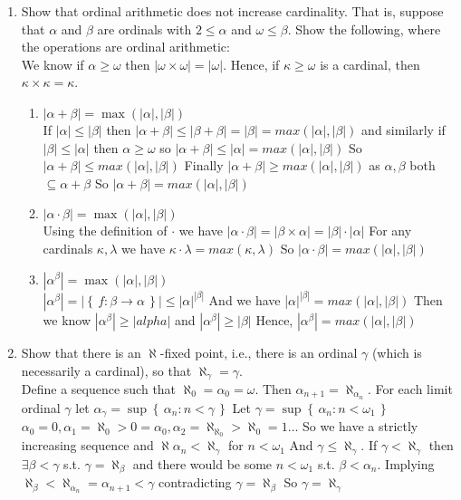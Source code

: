 \documentclass[11pt]{amsart}
\newcommand{\set}[1]{\left\{\,#1\,\right\}}
\begin{document}
\begin{enumerate}
\item Show that ordinal arithmetic does not increase cardinality. That is, suppose that $\alpha$ and $\beta$ are ordinals with $2 \leq \alpha$ and $\omega \leq \beta$. Show the following, where the operations are ordinal arithmetic:
\\
We know if $\alpha \geq \omega$ then $|\omega \times \omega| = |\omega|$.
Hence, if $\kappa \geq \omega$ is a cardinal, then $\kappa \times \kappa = \kappa$.
\ 
\begin{enumerate}
\item $|\alpha + \beta| = \max(|\alpha|, |\beta|)$
\\ If $|\alpha| \leq |\beta|$ then $|\alpha + \beta| \leq |\beta + \beta| = |\beta| = max(|\alpha|,|\beta|)$
and similarly if $|\beta| \leq |\alpha|$ then $\alpha \geq \omega$ so $|\alpha + \beta| \leq |\alpha| = max(|\alpha|,|\beta|)$
So $|\alpha + \beta| \leq max(|\alpha|,|\beta|)$
Finally $|\alpha + \beta| \geq max(|\alpha|,|\beta|)$ as $\alpha, \beta$ both $\subseteq \alpha + \beta$
So $|\alpha + \beta| = max(|\alpha|,|\beta|)$
\vfill
\item $|\alpha \cdot \beta| = \max(|\alpha|, |\beta|)$
\\ Using the definition of $\cdot$ we have $|\alpha \cdot \beta| = |\beta \times \alpha| = |\beta| \cdot |\alpha|$
For any cardinals $\kappa, \lambda$ we have $\kappa \cdot \lambda = max(\kappa,\lambda)$
So $|\alpha \cdot \beta| = max(|\alpha|,|\beta|)$
\vfill
\item $|\alpha^\beta| = \max(|\alpha|, |\beta|)$
\\ $|\alpha^\beta| = |\set{f : \beta \rightarrow \alpha}| \leq |\alpha|^{|\beta|}$
And we have |$\alpha|^{|\beta|} = max(|\alpha|,|\beta|)$
Then we know $|\alpha^\beta| \geq |alpha|$ and $|\alpha^\beta| \geq |\beta|$
Hence, $|\alpha^\beta| = max(|\alpha|,|\beta|)$
\vfill
\end{enumerate}

\newpage

\item Show that there is an $\aleph$-fixed point, i.e., there is an ordinal $\gamma$ (which is necessarily a cardinal), so that $\aleph_{\gamma} = \gamma$.
\\ Define a sequence such that $\aleph_0 = \alpha_0 = \omega$.
Then $\alpha_{n+1} = \aleph_{\alpha_n}$.
For each limit ordinal $\gamma$ let $\alpha_\gamma = \sup \set{\alpha_n : n < \gamma}$
Let $\gamma = \sup \set{\alpha_n : n < \omega_1}$
$\alpha_0 = 0, \alpha_1 = \aleph_0 > 0 = \alpha_0, \alpha_2 = \aleph_{\aleph_0} > \aleph_0 = 1 \dots$
So we have a strictly increasing sequence and $\aleph{\alpha_n} < \aleph_\gamma$ for $n < \omega_1$
And $\gamma \leq \aleph_\gamma$.
If $\gamma < \aleph_\gamma$ then $\exists \beta < \gamma$ s.t. $\gamma = \aleph_\beta$
and there would be some $n < \omega_1$ s.t. $\beta < \alpha_n$.
Implying $\aleph_\beta < \aleph_{\alpha_n} = \alpha_{n+1} < \gamma$ contradicting $\gamma = \aleph_\beta$
So $\gamma = \aleph_\gamma$


\end{enumerate}
\end{document}
